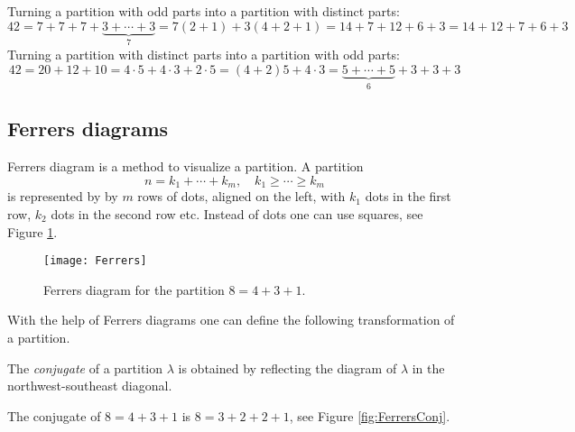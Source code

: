 \begin{page}

\begin{exl}
Turning a partition with odd parts into a partition with distinct parts:
\[
42 = 7+7+7+\underbrace{3+ \cdots +3}_{7} = 7 (2+1) + 3(4+2+1) = 14 + 7 + 12 + 6 + 3 = 14 + 12 + 7 + 6 + 3
\]
Turning a partition with distinct parts into a partition with odd parts:
\[
42 = 20 + 12 + 10 = 4\cdot 5 + 4 \cdot 3 + 2 \cdot 5 = (4+2)5 + 4\cdot 3 = \underbrace{5+\cdots+5}_{6} + 3 + 3 + 3
\]
\end{exl}

\end{page}

\begin{page}

\subsection{Ferrers diagrams}
Ferrers diagram is a method to visualize a partition.
A partition
\[
n = k_1 + \cdots + k_m, \quad k_1 \ge \cdots \ge k_m
\]
is represented by by $m$ rows of dots, aligned on the left, with $k_1$ dots in the first row, $k_2$ dots in the second row etc.
Instead of dots one can use squares, see Figure \ref{fig:Ferrers}.

\begin{figure}[ht]
\begin{center}
\texttt{[image: Ferrers]}
\end{center}
\caption{Ferrers diagram for the partition $8 = 4 + 3 + 1$.}
\label{fig:Ferrers}
\end{figure}

With the help of Ferrers diagrams one can define the following transformation of a partition.


\end{page}

\begin{page}

\begin{dfn}
The \emph{conjugate} of a partition $\lambda$ is
obtained by reflecting the diagram of $\lambda$ in the northwest-southeast diagonal.
\end{dfn}

\end{page}

\begin{page}

\begin{exl}
The conjugate of $8 = 4 + 3 + 1$ is $8 = 3 + 2 + 2 + 1$, see Figure \ref{fig:FerrersConj}.
\end{exl}

\end{page}

